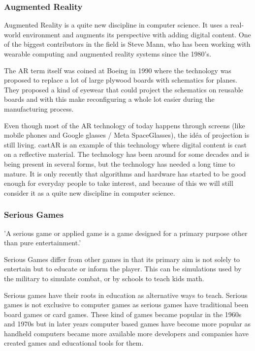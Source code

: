 \subsubsection{Augmented Reality}

\gls{Augmented Reality} is a quite new discipline in computer science. It uses
a real-world environment and augments its perspective with adding digital
content. One of the biggest contributors in the field is Steve Mann, who has been
working with wearable computing and augmented reality systems since the 1980's.

The \gls{AR} term itself was coined at Boeing\cite{boeingAR} in 1990 where the
technology was
proposed to replace a lot of large plywood boards with schematics for planes.
They proposed a kind of eyewear that could project the schematics on reusable
boards and with this make reconfiguring a whole lot easier during the
manufacturing process.

Even though most of the AR technology of today happens through screens (like
mobile phones and Google glasses\cite{GoogleGlasses} / Meta SpaceGlasses\cite{MetaSpaceGlasses}),
the id\'{e}a of projection is still living. castAR is an example of this 
technology where digital content is cast on a reflective material.
The technology has been around for some decades and is being present in several
forms, but the technology has needed a long time to mature. It is only recently
that algorithms and hardware has started to be good enough for everyday people
to take interest, and because of this we will still consider it as a quite new 
discipline in computer science.

\subsubsection{Serious Games}

'A serious game or applied game is a game designed for a primary purpose other than pure entertainment.'\cite{wiki:SeriousGames}

Serious Games differ from other games in that its primary aim is not solely to entertain but to educate or inform the player.
This can be simulations used by the military to simulate combat, or by schools to teach kids math.

Serious games have their roots in education as alternative ways to teach.
Serious games is not exclusive to computer games as serious games have traditional been board games or card games.
These kind of games became popular in the 1960s and 1970s but in later years computer based games have become more 
popular as handheld computers became more available more developers and companies have created games and educational tools for them.

